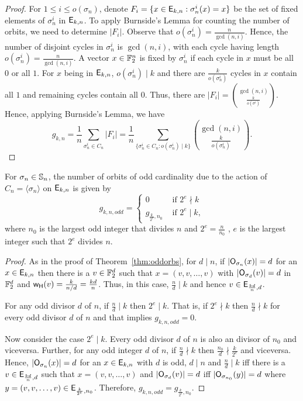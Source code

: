 \documentclass{llncs}
\begin{document}
\begin{proof}
For $1 \leq i \leq o(\sigma_n)$, denote $F_i = \{x \in \mathsf{E}_{k,n}: \sigma_n^i(x) = x \}$ be the set of fixed elements of $\sigma_n^i$ in $\mathsf{E}_{k,n}$. To apply Burnside's Lemma for counting the number of orbits, we need to determine $|F_i|$. Observe that $o(\sigma_n^i) = \frac{n}{\gcd(n,i)}$. Hence, the number of disjoint cycles in $\sigma_n^i$ is $\gcd(n,i)$, with each cycle having length $o(\sigma_n^i) = \frac{n}{\gcd(n,i)}$. A vector $x \in \mathbb{F}_2^n$ is fixed by $\sigma_n^i$ if each cycle in $x$ must be all $0$ or all $1$. For $x$ being in $\mathsf{E}_{k,n}$, $o(\sigma_n^i) \mid k$ and there are $\frac{k}{o(\sigma_n^i)}$ cycles in $x$ contain all $1$ and remaining cycles contain all $0$. Thus, there are $|F_i| = {\gcd(n,i)  \choose \frac{k}{o(\sigma^i)}}$. Hence, applying Burnside's Lemma, we have
$$g_{k,n}= \frac{1}{n} \sum_{\sigma_n^i \in C_n} |F_i| =  \frac{1}{n} \sum\limits_{\{\sigma_n^i \in C_n : o(\sigma_n^i) \mid k \}} {\gcd(n,i)  \choose \frac{k}{o(\sigma_n^i)}}.$$     
\end{proof}
\begin{lemma}\label{lem:rotodd}
For $\sigma_n \in \mathbb{S}_n$, the number of orbits of odd cardinality due to the action of $C_n = \langle\sigma_n\rangle$ on $\mathsf{E}_{k,n}$ is given by
$$g_{k,n,odd} = \begin{cases}
				 0 & \text{ if } 2^e \nmid k \\
                 g_{\frac{k}{2^e},n_0} & \text{ if } 2^e \mid k,
                \end{cases}$$
where $n_0$ is the largest odd integer that divides $n$ and $2^e = \frac{n}{n_0}$ \ie, $e$ is the largest integer such that $2^e$ divides $n$.
\end{lemma}
\begin{proof}
As in the proof of Theorem~\ref{thm:oddorbs}, for $d \mid n$, if $|\mathsf{O}_{\sigma_n}(x)| = d$ for an $x \in \mathsf{E}_{k,n}$ then there is a $v \in \mathbb{F}_2^d$ such that $x = (v,v, \ldots, v)$ with $|\mathsf{O}_{\sigma_d}(v)| = d$ in $\mathbb{F}_2^d$ and $\mathsf{w_H}(v) = \frac{k}{n/d} = \frac{kd}{n}$. Thus, in this case, $\frac{n}{d} \mid k$ and hence $v \in \mathsf{E}_{\frac{kd}{n},d}$. 

\noindent For any odd divisor $d$ of $n$, if $\frac{n}{d} \mid k$ then $2^e \mid k$. That is, if $2^e \nmid k$ then $\frac{n}{d} \nmid k$ for every odd divisor $d$ of $n$ and that implies $g_{k,n,odd} = 0$.

\noindent Now consider the case $2^e \mid k$. Every odd divisor $d$ of $n$ is also an divisor of $n_0$ and viceversa. Further, for any odd integer $d$ of $n$, if $\frac{n}{d} \nmid k$ then $\frac{n_0}{d} \nmid \frac{k}{2^e}$ and viceversa.
Hence, $|\mathsf{O}_{\sigma_n}(x)| = d$ for an $x\in \mathsf{E}_{k,n}$ with $d$ is odd, $d\mid n$ and  $\frac{n}{d} \mid k$ iff there is a $v \in \mathsf{E}_{\frac{kd}{n},d}$ such that $x = (v,v, \ldots, v)$ and $|\mathsf{O}_{\sigma_d}(v)| = d$ iff $|\mathsf{O}_{\sigma_{n_0}}(y)| = d$ where $y = (v,v, \ldots, v) \in \mathsf{E}_{\frac{k}{2^e},n_0}$. Therefore, $g_{k,n,odd} = g_{\frac{k}{2^e},n_0}$.
\end{proof}
\end{document}

